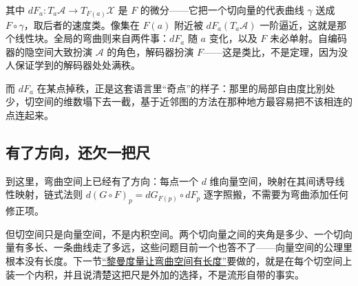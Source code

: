 其中 \(dF_{a}:T_{a}\mathcal{A}\to T_{F(a)}\mathcal{X}\) 是 \(F\) 的微分——它把一个切向量的代表曲线 \(\gamma\) 送成 \(F\circ\gamma\)，取后者的速度类。像集在 \(F(a)\) 附近被 \(dF_{a}(T_{a}\mathcal{A})\) 一阶逼近，这就是那个线性块。全局的弯曲则来自两件事：\(dF_{a}\) 随 \(a\) 变化，以及 \(F\) 未必单射。自编码器的隐空间大致扮演 \(\mathcal{A}\) 的角色，解码器扮演 \(F\)——这是类比，不是定理，因为没人保证学到的解码器处处满秩。

而 \(dF_{a}\) 在某点掉秩，正是这套语言里``奇点''的样子：那里的局部自由度比别处少，切空间的维数塌下去一截，基于近邻图的方法在那种地方最容易把不该相连的点连起来。

\subsection{有了方向，还欠一把尺}

到这里，弯曲空间上已经有了方向：每点一个 \(d\) 维向量空间，映射在其间诱导线性映射，链式法则 \(d(G\circ F)_{p}=dG_{F(p)}\circ dF_{p}\) 逐字照搬，不需要为弯曲添加任何修正项。

但切空间只是向量空间，不是内积空间。两个切向量之间的夹角是多少、一个切向量有多长、一条曲线走了多远，这些问题目前一个也答不了——向量空间的公理里根本没有长度。下一节\hyperref[sec:12-Real-Analysis-Support/08-Manifold-Basics/03]{``黎曼度量让弯曲空间有长度''}要做的，就是在每个切空间上装一个内积，并且说清楚这把尺是外加的选择，不是流形自带的事实。
